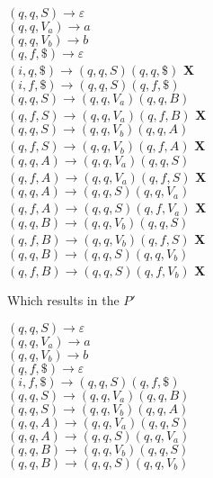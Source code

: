 \documentclass{article}
\begin{document}
\begin{center}
	$(q, q, S) \rightarrow \varepsilon$ \\
	$(q, q, V_a) \rightarrow a$ \\
	$(q, q, V_b) \rightarrow b$ \\
	$(q, f, \$) \rightarrow \varepsilon$ \\
	\hfill \break
	$(i, q, \$) \rightarrow (q, q, S)(q, q, \$)$ \textbf{X} \\ 
	$(i, f, \$) \rightarrow (q, q, S)(q, f, \$)$ \\
	\hfill \break
	$(q, q, S) \rightarrow (q, q, V_a)(q, q, B)$ \\
	$(q, f, S) \rightarrow (q, q, V_a)(q, f, B)$ \textbf{X} \\
	\hfill \break
	$(q, q, S) \rightarrow (q, q, V_b)(q, q, A)$ \\
	$(q, f, S) \rightarrow (q, q, V_b)(q, f, A)$ \textbf{X} \\
	\hfill \break
	$(q, q, A) \rightarrow (q, q, V_a)(q, q, S)$ \\
	$(q, f, A) \rightarrow (q, q, V_a)(q, f, S)$ \textbf{X} \\
	\hfill \break
	$(q, q, A) \rightarrow (q, q, S)(q, q, V_a)$ \\
	$(q, f, A) \rightarrow (q, q, S)(q, f, V_a)$ \textbf{X} \\
	\hfill \break
	$(q, q, B) \rightarrow (q, q, V_b)(q, q, S)$ \\
	$(q, f, B) \rightarrow (q, q, V_b)(q, f, S)$ \textbf{X} \\
	\hfill \break
	$(q, q, B) \rightarrow (q, q, S)(q, q, V_b)$ \\
	$(q, f, B) \rightarrow (q, q, S)(q, f, V_b)$ \textbf{X} \\
\end{center}

Which results in the $P'$

\begin{center}
	$(q, q, S) \rightarrow \varepsilon$ \\
	$(q, q, V_a) \rightarrow a$ \\
	$(q, q, V_b) \rightarrow b$ \\
	$(q, f, \$) \rightarrow \varepsilon$ \\
	$(i, f, \$) \rightarrow (q, q, S)(q, f, \$)$ \\
	$(q, q, S) \rightarrow (q, q, V_a)(q, q, B)$ \\
	$(q, q, S) \rightarrow (q, q, V_b)(q, q, A)$ \\
	$(q, q, A) \rightarrow (q, q, V_a)(q, q, S)$ \\
	$(q, q, A) \rightarrow (q, q, S)(q, q, V_a)$ \\
	$(q, q, B) \rightarrow (q, q, V_b)(q, q, S)$ \\
	$(q, q, B) \rightarrow (q, q, S)(q, q, V_b)$ \\
\end{center}
\end{document}
